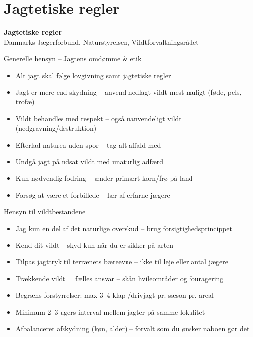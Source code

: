 \section{Jagtetiske regler}

\begin{frame}
  \vspace{3em}
  \begin{center}
    {\LARGE \textbf{Jagtetiske regler}}
    \\
    \vspace{1em}
    Danmarks Jægerforbund, Naturstyrelsen, Vildtforvaltningsrådet
  \end{center}
\end{frame}

\begin{frame}{Generelle hensyn – Jagtens omdømme \& etik}
\begin{itemize}
\item Alt jagt skal følge lovgivning samt jagtetiske regler
\item Jagt er mere end skydning – anvend nedlagt vildt mest muligt (føde, pels, trofæ)
\item Vildt behandles med respekt – også uanvendeligt vildt (nedgravning/destruktion)
\item Efterlad naturen uden spor – tag alt affald med
\item Undgå jagt på udsat vildt med unaturlig adfærd
\item Kun nødvendig fodring – ænder primært korn/frø på land
\item Forsøg at være et forbillede – lær af erfarne jægere
\end{itemize}
\end{frame}

\begin{frame}{Hensyn til vildtbestandene}
\begin{itemize}
\item Jag kun en del af det naturlige overskud – brug forsigtighedsprincippet
\item Kend dit vildt – skyd kun når du er sikker på arten
\item Tilpas jagttryk til terrænets bæreevne – ikke til leje eller antal jægere
\item Trækkende vildt = fælles ansvar – skån hvileområder og fouragering
\item Begræns forstyrrelser: max 3–4 klap-/drivjagt pr. sæson pr. areal
\item Minimum 2–3 ugers interval mellem jagter på samme lokalitet
\item Afbalanceret afskydning (køn, alder) – forvalt som du ønsker naboen gør det
\end{itemize}
\end{frame}

